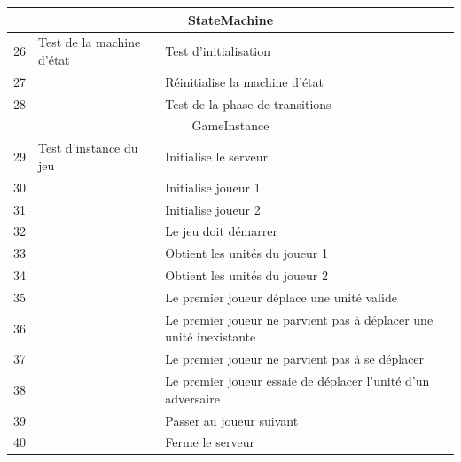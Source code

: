 \begin{center}
\begin{tabular}{|l|l|l|}
        \hline
    \end{tabular}


    \begin{tabular}{|l|l|l|}

        \hline
        \multicolumn{3}{|c|}{StateMachine}                                                                     \\
        \hline

        26 & Test de la machine d'état    & Test d'initialisation                                              \\
        27 &                              & Réinitialise la machine d'état                                     \\
        28 &                              & Test  de la phase de transitions                                   \\




        \hline
        \multicolumn{3}{c}{GameInstance}                                                                       \\
        \hline
        29 & Test d'instance du jeu       & Initialise le serveur                                              \\
        30 &                              & Initialise joueur  1                                               \\
        31 &                              & Initialise joueur 2                                                \\
        32 &                              & Le jeu doit démarrer                                               \\
        33 &                              & Obtient les unités du joueur 1                                     \\
        34 &                              & Obtient les unités du joueur 2                                     \\
        35 &                              & Le premier joueur déplace une unité valide                         \\
        36 &                              & Le premier joueur ne parvient pas à déplacer une unité inexistante \\
        37 &                              & Le premier joueur ne parvient pas à se déplacer                    \\ %
        38 &                              & Le premier joueur essaie de déplacer l'unité d'un adversaire       \\
        39 &                              & Passer au joueur suivant                                           \\
        40 &                              & Ferme le serveur                                                   \\



\end{tabular}
\end{center}
